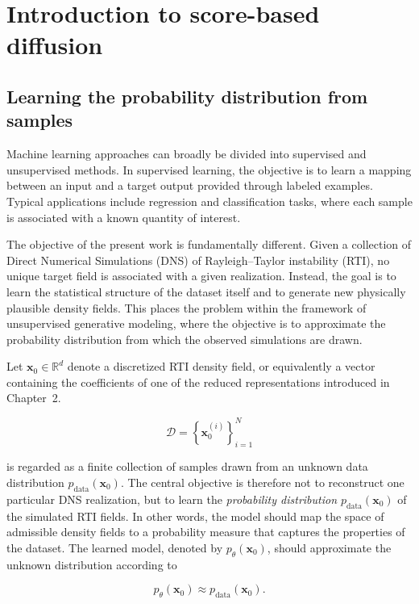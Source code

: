 \section{Introduction to score-based diffusion}

\subsection{Learning the probability distribution from samples}

Machine learning approaches can broadly be divided into supervised and unsupervised methods. In supervised learning, the objective is to learn a mapping between an input and a target output provided through labeled examples. Typical applications include regression and classification tasks, where each sample is associated with a known quantity of interest.

The objective of the present work is fundamentally different. Given a collection of Direct Numerical Simulations (DNS) of Rayleigh--Taylor instability (RTI), no unique target field is associated with a given realization. Instead, the goal is to learn the statistical structure of the dataset itself and to generate new physically plausible density fields. This places the problem within the framework of unsupervised generative modeling, where the objective is to approximate the probability distribution from which the observed simulations are drawn.

Let $\mathbf{x}_0\in\mathbb{R}^{d}$ denote a discretized RTI density field, or equivalently a vector containing the coefficients of one of the reduced representations introduced in Chapter~2.

\begin{equation}
    \mathcal{D}=\left\{\mathbf{x}_0^{(i)}\right\}_{i=1}^{N}
\end{equation}

is regarded as a finite collection of samples drawn from an unknown data
distribution $p_{\mathrm{data}}(\mathbf{x}_0)$. The central objective is therefore not to reconstruct one particular DNS realization, but to
learn the \emph{probability distribution $p_{\mathrm{data}}(\mathbf{x}_0)$} of the simulated RTI
fields. In other words, the model should map the space of admissible density fields to a probability measure that captures the properties of the dataset.
The learned model, denoted by $p_{\theta}(\mathbf{x}_0)$, should approximate the
unknown distribution according to

\begin{equation}
    p_{\theta}(\mathbf{x}_0)\approx
    p_{\mathrm{data}}(\mathbf{x}_0).
\end{equation}

